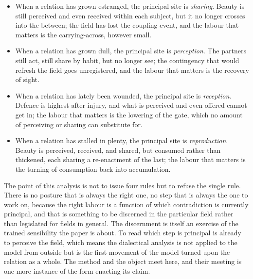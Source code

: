 \begin{itemize}
  \item When a relation has grown estranged, the principal site is \emph{sharing}. Beauty is still perceived and even received within each subject, but it no longer crosses into the between; the field has lost the coupling event, and the labour that matters is the carrying-across, however small.
  \item When a relation has grown dull, the principal site is \emph{perception}. The partners still act, still share by habit, but no longer see; the contingency that would refresh the field goes unregistered, and the labour that matters is the recovery of sight.
  \item When a relation has lately been wounded, the principal site is \emph{reception}. Defence is highest after injury, and what is perceived and even offered cannot get in; the labour that matters is the lowering of the gate, which no amount of perceiving or sharing can substitute for.
  \item When a relation has stalled in plenty, the principal site is \emph{reproduction}. Beauty is perceived, received, and shared, but consumed rather than thickened, each sharing a re-enactment of the last; the labour that matters is the turning of consumption back into accumulation.
\end{itemize}

The point of this analysis is not to issue four rules but to refuse the single rule. There is no posture that is always the right one, no step that is always the one to work on, because the right labour is a function of which contradiction is currently principal, and that is something to be discerned in the particular field rather than legislated for fields in general. The discernment is itself an exercise of the trained sensibility the paper is about. To read which step is principal is already to perceive the field, which means the dialectical analysis is not applied to the model from outside but is the first movement of the model turned upon the relation as a whole. The method and the object meet here, and their meeting is one more instance of the form enacting its claim.

